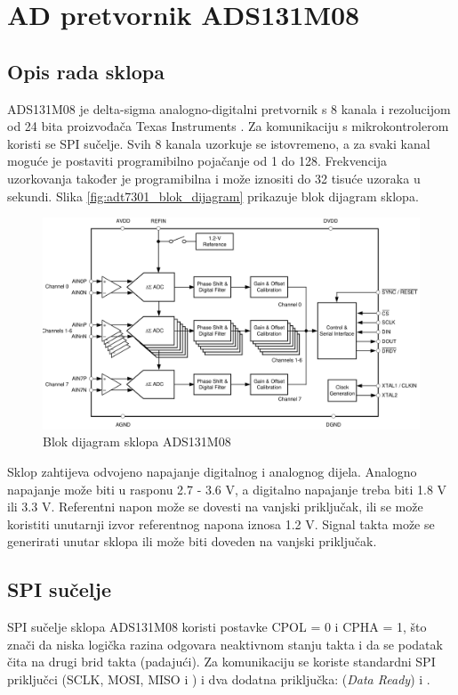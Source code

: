 \section{AD pretvornik ADS131M08} \label{section_adc}

\subsection{Opis rada sklopa}
ADS131M08 je delta-sigma analogno-digitalni pretvornik s 8 kanala i rezolucijom od 24 bita proizvođača Texas Instruments \cite{ads131m08_datasheet}. Za komunikaciju s mikrokontrolerom koristi se SPI sučelje. Svih 8 kanala uzorkuje se istovremeno, a za svaki kanal moguće je postaviti programibilno pojačanje od 1 do 128. Frekvencija uzorkovanja također je programibilna i može iznositi do 32 tisuće uzoraka u sekundi. Slika \ref{fig:adt7301_blok_dijagram} prikazuje blok dijagram sklopa.

\begin{figure}[htb]
    \centering
    \includegraphics[width=\textwidth]{slike/ads131m08_blok_dijagram.png}
    \caption{Blok dijagram sklopa ADS131M08 \cite{ads131m08_datasheet}}
    \label{fig:ads131m08_blok_dijagram}
\end{figure}

Sklop zahtijeva odvojeno napajanje digitalnog i analognog dijela. Analogno napajanje može biti u rasponu 2.7 - 3.6 V, a digitalno napajanje treba biti 1.8 V ili 3.3 V. Referentni napon može se dovesti na vanjski priključak, ili se može koristiti unutarnji izvor referentnog napona iznosa 1.2 V. Signal takta može se generirati unutar sklopa ili može biti doveden na vanjski priključak. 

\subsection{SPI sučelje}
SPI sučelje sklopa ADS131M08 koristi postavke CPOL = 0 i CPHA = 1, što znači da niska logička razina odgovara neaktivnom stanju takta i da se podatak čita na drugi brid takta (padajući). Za komunikaciju se koriste standardni SPI priključci (SCLK, MOSI, MISO i ) i dva dodatna priključka:  (\textit{Data Ready}) i .

